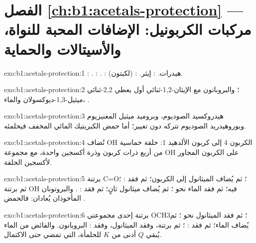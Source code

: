\section*{الفصل \ref{ch:b1:acetals-protection} --- مركبات الكربونيل: الإضافات المحبة للنواة، والأسيتالات والحماية}

\begin{solution}{exo:b1:acetals-protection:1}
: . : .
: هيدرات. : إيثر. :
 (لكيتون).
\end{solution}

\begin{solution}{exo:b1:acetals-protection:2}
؛ والبروبانون مع
الإيثان-1,2-ثنائي أول يعطي 2,2-ثنائي ميثيل-1,3-ديوكسولان والماء،
.
\end{solution}

\begin{solution}{exo:b1:acetals-protection:3}
هيدروكسيد الصوديوم، وبروميد ميثيل المغنيزيوم وبوروهيدريد الصوديوم تتركه
دون تغيير؛ أما حمض الكبريتيك المائي المخفف فيحلمئه.
\end{solution}

\begin{solution}{exo:b1:acetals-protection:4}
تُضاف OH الكربون 4 إلى كربون الألدهيد 1: حلقة خماسية من
أربع ذرات كربون وذرة أكسجين واحدة، مع مجموعة OH على الكربون المجاور لأكسجين
الحلقة.
\end{solution}

\begin{solution}{exo:b1:acetals-protection:5}
برتنة C=O؛ ثم يُضاف الميثانول إلى الكربون؛ ثم فقد : ؛
ثم برتنة OH فيه؛ ثم فقد الماء نحو ؛ ثم يُضاف ميثانول
ثانٍ؛ ثم فقد : . والبروتونان المأخوذان يُعادان:
فالحمض .
\end{solution}

\begin{solution}{exo:b1:acetals-protection:6}
برتنة إحدى مجموعتي OCH3؛ ثم فقد الميثانول نحو ؛ ثم يُضاف الماء؛
ثم فقد : ؛ ثم برتنة، وفقد الميثانول، وفقد :
البروبانون. والفائض من الماء يُبقي $Q$ أدنى من $K$ للحلمأة، التي تمضي
حتى الاكتمال.
\end{solution}

